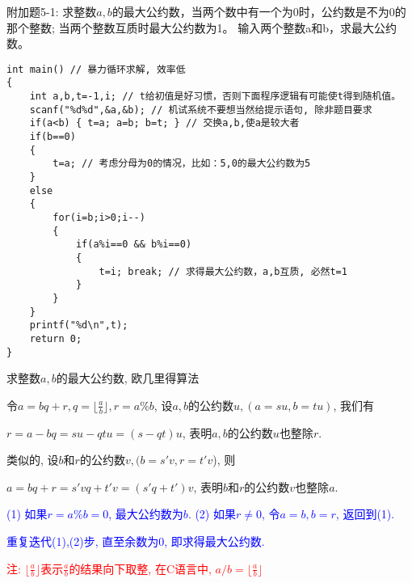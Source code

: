 \begin{frame}
附加题5-1: 求整数$a,b$的最大公约数，当两个数中有一个为0时，公约数是不为0的那个整数; 当两个整数互质时最大公约数为1。
输入两个整数a和b，求最大公约数。 
\pause
\begin{lstlisting}
int main() // 暴力循环求解, 效率低
{
	int a,b,t=-1,i; // t给初值是好习惯，否则下面程序逻辑有可能使t得到随机值。 
	scanf("%d%d",&a,&b); // 机试系统不要想当然给提示语句, 除非题目要求  
	if(a<b) { t=a; a=b; b=t; } // 交换a,b,使a是较大者 
	if(b==0) 
	{
		t=a; // 考虑分母为0的情况，比如：5,0的最大公约数为5 
	} 
	else
	{
		for(i=b;i>0;i--)
		{
			if(a%i==0 && b%i==0)
			{
				t=i; break; // 求得最大公约数，a,b互质, 必然t=1 
			}
		}
	}
	printf("%d\n",t);
	return 0;	
}
\end{lstlisting}
\end{frame}

\begin{frame}[fragile]{求整数$a,b$的最大公约数, 欧几里得算法}
\vspace{-0.3cm}

令$a=bq+r, q=\lfloor\frac{a}{b}\rfloor,r=a\%b$, 设$a,b$的公约数$u,(a=su, b=tu)$, 我们有

$r=a-bq=su-qtu=(s-qt)u$, 表明$a,b$的公约数$u$也整除$r$. 

类似的, 设$b$和$r$的公约数$v,(b=s'v, r=t'v$), 则

$a=bq+r=s'vq+t'v=(s'q+t')v$, 表明$b$和$r$的公约数$v$也整除$a$.

\medskip
\textcolor{blue}{(1) 如果$r=a\%b=0$, 最大公约数为$b$. (2) 如果$r\ne 0$, 令$a=b,b=r$, 返回到(1).}

\textcolor{blue}{重复迭代(1),(2)步, 直至余数为0, 即求得最大公约数.}

\small\textcolor{red}{注: $\lfloor\frac{a}{b}\rfloor$表示$\frac{a}{b}$的结果向下取整, 在C语言中, $a/b=\lfloor\frac{a}{b}\rfloor$}
\end{frame}

